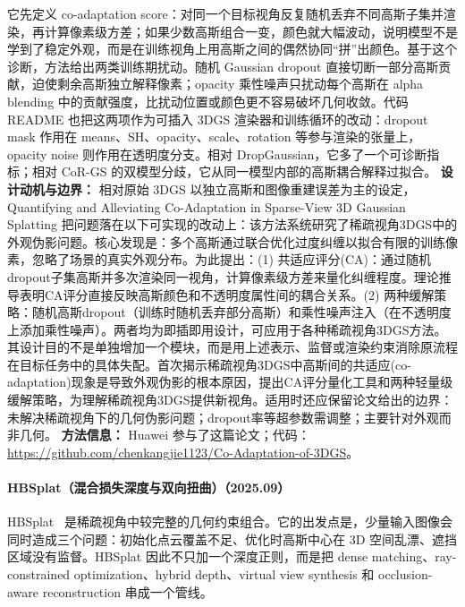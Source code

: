 它先定义 co-adaptation score：对同一个目标视角反复随机丢弃不同高斯子集并渲染，再计算像素级方差；如果少数高斯组合一变，颜色就大幅波动，说明模型不是学到了稳定外观，而是在训练视角上用高斯之间的偶然协同“拼”出颜色。基于这个诊断，方法给出两类训练期扰动。随机 Gaussian dropout 直接切断一部分高斯贡献，迫使剩余高斯独立解释像素；opacity 乘性噪声只扰动每个高斯在 alpha blending 中的贡献强度，比扰动位置或颜色更不容易破坏几何收敛。代码 README 也把这两项作为可插入 3DGS 渲染器和训练循环的改动：dropout mask 作用在 means、SH、opacity、scale、rotation 等参与渲染的张量上，opacity noise 则作用在透明度分支。相对 DropGaussian，它多了一个可诊断指标；相对 CoR-GS 的双模型分歧，它从同一模型内部的高斯耦合解释过拟合。
\textbf{设计动机与边界：} 相对原始 3DGS 以独立高斯和图像重建误差为主的设定，Quantifying and Alleviating Co-Adaptation in Sparse-View 3D Gaussian Splatting 把问题落在以下可实现的改动上：该方法系统研究了稀疏视角3DGS中的外观伪影问题。核心发现是：多个高斯通过联合优化过度纠缠以拟合有限的训练像素，忽略了场景的真实外观分布。为此提出：(1) 共适应评分(CA)：通过随机dropout子集高斯并多次渲染同一视角，计算像素级方差来量化纠缠程度。理论推导表明CA评分直接反映高斯颜色和不透明度属性间的耦合关系。(2) 两种缓解策略：随机高斯dropout（训练时随机丢弃部分高斯）和乘性噪声注入（在不透明度上添加乘性噪声）。两者均为即插即用设计，可应用于各种稀疏视角3DGS方法。其设计目的不是单独增加一个模块，而是用上述表示、监督或渲染约束消除原流程在目标任务中的具体失配。首次揭示稀疏视角3DGS中高斯间的共适应(co-adaptation)现象是导致外观伪影的根本原因，提出CA评分量化工具和两种轻量级缓解策略，为理解稀疏视角3DGS提供新视角。适用时还应保留论文给出的边界：未解决稀疏视角下的几何伪影问题；dropout率等超参数需调整；主要针对外观而非几何。
\textbf{方法信息：} Huawei 参与了这篇论文；代码：\url{https://github.com/chenkangjie1123/Co-Adaptation-of-3DGS}。



\paragraph{HBSplat（混合损失深度与双向扭曲）（2025.09）}
HBSplat~\cite{2509_24893} 是稀疏视角中较完整的几何约束组合。它的出发点是，少量输入图像会同时造成三个问题：初始化点云覆盖不足、优化时高斯中心在 3D 空间乱漂、遮挡区域没有监督。HBSplat 因此不只加一个深度正则，而是把 dense matching、ray-constrained optimization、hybrid depth、virtual view synthesis 和 occlusion-aware reconstruction 串成一个管线。

